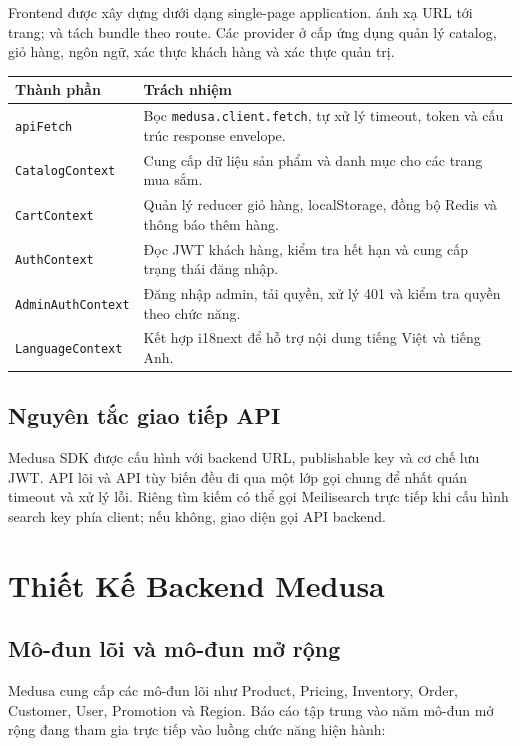 Frontend được xây dựng dưới dạng single-page application.  ánh xạ URL tới trang;  và  tách bundle theo route. Các provider ở cấp ứng dụng quản lý catalog, giỏ hàng, ngôn ngữ, xác thực khách hàng và xác thực quản trị.

\begin{longtable}{@{}L{0.25\textwidth} L{0.67\textwidth}@{}}
  \toprule
  \textbf{Thành phần} & \textbf{Trách nhiệm} \\
  \midrule
  \endhead
  \texttt{apiFetch} & Bọc \texttt{medusa.client.fetch}, tự xử lý timeout, token và cấu trúc response envelope. \\
  \texttt{CatalogContext} & Cung cấp dữ liệu sản phẩm và danh mục cho các trang mua sắm. \\
  \texttt{CartContext} & Quản lý reducer giỏ hàng, localStorage, đồng bộ Redis và thông báo thêm hàng. \\
  \texttt{AuthContext} & Đọc JWT khách hàng, kiểm tra hết hạn và cung cấp trạng thái đăng nhập. \\
  \texttt{AdminAuthContext} & Đăng nhập admin, tải quyền, xử lý 401 và kiểm tra quyền theo chức năng. \\
  \texttt{LanguageContext} & Kết hợp i18next để hỗ trợ nội dung tiếng Việt và tiếng Anh. \\
  \bottomrule
\end{longtable}

\subsection{Nguyên tắc giao tiếp API}

Medusa SDK được cấu hình với backend URL, publishable key và cơ chế lưu JWT. API lõi và API tùy biến đều đi qua một lớp gọi chung để nhất quán timeout và xử lý lỗi. Riêng tìm kiếm có thể gọi Meilisearch trực tiếp khi cấu hình search key phía client; nếu không, giao diện gọi API backend.

\section{Thiết Kế Backend Medusa}

\subsection{Mô-đun lõi và mô-đun mở rộng}

Medusa cung cấp các mô-đun lõi như Product, Pricing, Inventory, Order, Customer, User, Promotion và Region. Báo cáo tập trung vào năm mô-đun mở rộng đang tham gia trực tiếp vào luồng chức năng hiện hành:

